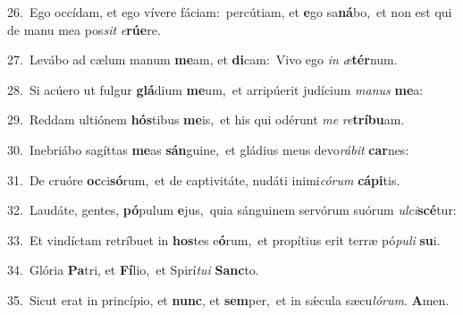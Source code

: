 {\numbfont\textcolor{\numbcolor}{26.}}~Ego occídam, et ego vívere fáciam:~\dagger percútiam, et \textbf{e}\-go sa\-\textbf{ná}\-bo,~\star et non est qui de manu mea pos\textit{sit} \textit{e}\-\textbf{rú}\textbf{e}re.\par
{\numbfont\textcolor{\numbcolor}{27.}}~Levábo ad cælum manum \textbf{me}\-am, et \textbf{di}\-cam:~\star Vivo ego \textit{in} \textit{æ}\-\textbf{tér}num.\par
{\numbfont\textcolor{\numbcolor}{28.}}~Si acúero ut fulgur \textbf{glá}\-dium \textbf{me}\-um,~\star et arripúerit judícium \textit{ma}\-\textit{nus} \textbf{me}\-a:\par
{\numbfont\textcolor{\numbcolor}{29.}}~Reddam ultiónem \textbf{hós}\-tibus \textbf{me}\-is,~\star et his qui odérunt \textit{me} \textit{re}\-\textbf{trí}\textbf{bu}am.\par
{\numbfont\textcolor{\numbcolor}{30.}}~Inebriábo sagíttas \textbf{me}\-as \textbf{sán}\-guine,~\star et gládius meus devo\-\textit{rá}\-\textit{bit} \textbf{car}\-nes:\par
{\numbfont\textcolor{\numbcolor}{31.}}~De cruóre \textbf{oc}\-ci\-\textbf{só}\-rum,~\star et de captivitáte, nudáti inimi\-\textit{có}\-\textit{rum} \textbf{cá}\-\textbf{pi}tis.\par
{\numbfont\textcolor{\numbcolor}{32.}}~Laudáte, gentes, \textbf{pó}\-pulum \textbf{e}\-jus,~\star quia sánguinem servórum suórum \textit{ul}\-\textit{ci}\textbf{scé}tur:\par
{\numbfont\textcolor{\numbcolor}{33.}}~Et vindíctam retríbuet in \textbf{hos}\-tes e\-\textbf{ó}\-rum,~\star et propítius erit terræ pó\-\textit{pu}\-\textit{li} \textbf{su}\-i.\par
{\numbfont\textcolor{\numbcolor}{34.}}~Glória \textbf{Pa}\-tri, et \textbf{Fí}\-lio,~\star et Spirí\-\textit{tu}\-\textit{i} \textbf{Sanc}\-to.\par
{\numbfont\textcolor{\numbcolor}{35.}}~Sicut erat in princípio, et \textbf{nunc}\-, et \textbf{sem}\-per,~\star et in sǽcula sæcu\-\textit{ló}\-\textit{rum}. \textbf{A}\-men.\par
